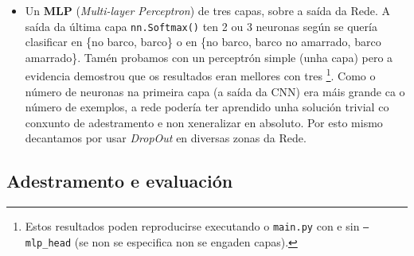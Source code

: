 \documentclass{article}
\begin{document}
\begin{itemize}
Sobre o aumento de datos comentar que a relación dos hiperparámetros que o definen e problemática para nos faceren probas: se cambiamos varios de unha vez non está necesariamente claro a cal dos cambiados débese a mellora ou empeora do rendimiento; se, en cambio, cambiamos só un de cada vez, a búsqueda no espacio de hiperparámetros do aumento de datos vólvese prohibitiva \footnote{Se un pásase cas fluctuacións de cor, non conseguirá imaxes útiles nin converxirá a Rede, se un quédase corto será como non ter feito nada. As modificacións que atopamos axeitadas foron guiadas pola nosa (non entrenada) intuición e con probas.}. E por isto que sabemos que a nosa configuración debe ser subóptima, pero non temos nada para evitalo.
\item Un \textbf{MLP} (\emph{Multi-layer Perceptron}) de tres capas, sobre a saída da Rede. A saída da última capa \texttt{nn.Softmax()} ten 2 ou 3 neuronas según se quería clasificar en \{no barco, barco\} o en \{no barco, barco no amarrado, barco amarrado\}. Tamén probamos con un perceptrón simple (unha capa) pero a evidencia demostrou que os resultados eran mellores con tres \footnote{Estos resultados poden reproducirse executando o \texttt{main.py} con e sin \texttt{--mlp\_head} (se non se especifica non se engaden capas).}. Como o número de neuronas na primeira capa (a saída da CNN) era máis grande ca o número de exemplos, a rede podería ter aprendido unha solución trivial co conxunto de adestramento e non xeneralizar en absoluto. Por esto mismo decantamos por usar \emph{DropOut} \cite{srivastava2014dropout} en diversas zonas da Rede. 
\end{itemize}

\subsection{Adestramento e evaluación}
\end{document}

